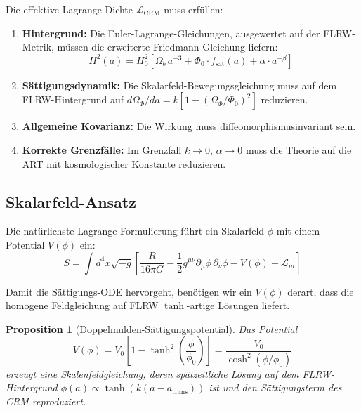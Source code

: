 \documentclass[11pt,a4paper]{article}
\newtheorem{proposition}{Proposition}
\begin{document}
Die effektive Lagrange-Dichte $\mathcal{L}_{\mathrm{CRM}}$ muss erf\"ullen:
\begin{enumerate}
\item \textbf{Hintergrund:} Die Euler-Lagrange-Gleichungen, ausgewertet auf der FLRW-Metrik, m\"ussen die erweiterte Friedmann-Gleichung liefern:
\begin{equation}
H^2(a) = H_0^2 \left[\Omega_b\,a^{-3} + \Phi_0 \cdot f_{\mathrm{sat}}(a) + \alpha \cdot a^{-\beta}\right]
\end{equation}

\item \textbf{S\"attigungsdynamik:} Die Skalarfeld-Bewegungsgleichung muss auf dem FLRW-Hintergrund auf $d\Omega_\Phi/da = k[1 - (\Omega_\Phi/\Phi_0)^2]$ reduzieren.

\item \textbf{Allgemeine Kovarianz:} Die Wirkung muss diffeomorphismusinvariant sein.

\item \textbf{Korrekte Grenzf\"alle:} Im Grenzfall $k \to 0$, $\alpha \to 0$ muss die Theorie auf die ART mit kosmologischer Konstante reduzieren.
\end{enumerate}

\subsection{Skalarfeld-Ansatz}

Die nat\"urlichste Lagrange-Formulierung f\"uhrt ein Skalarfeld $\phi$ mit einem Potential $V(\phi)$ ein:
\begin{equation}
S = \int d^4x \sqrt{-g} \left[\frac{R}{16\pi G} - \frac{1}{2} g^{\mu\nu}\partial_\mu\phi\,\partial_\nu\phi - V(\phi) + \mathcal{L}_m\right]
\label{eq:action_scalar}
\end{equation}

Damit die S\"attigungs-ODE hervorgeht, ben\"otigen wir ein $V(\phi)$ derart, dass die homogene Feldgleichung auf FLRW $\tanh$-artige L\"osungen liefert.

\begin{proposition}[Doppelmulden-S\"attigungspotential]
Das Potential
\begin{equation}
V(\phi) = V_0 \left[1 - \tanh^2\!\left(\frac{\phi}{\phi_0}\right)\right] = \frac{V_0}{\cosh^2(\phi/\phi_0)}
\label{eq:double_well}
\end{equation}
erzeugt eine Skalenfeldgleichung, deren sp\"atzeitliche L\"osung auf dem FLRW-Hintergrund $\phi(a) \propto \tanh(k(a - a_{\mathrm{trans}}))$ ist und den S\"attigungsterm des CRM reproduziert.
\end{proposition}
\end{document}
